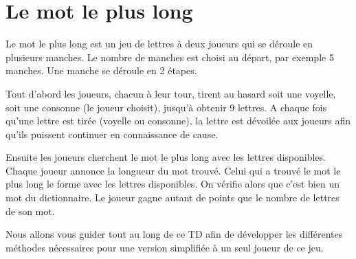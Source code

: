 \documentclass[a4paper,11pt]{style-esi/td}
\begin{document}


\section{Le mot le plus long}

	Le mot le plus long est un jeu de lettres à deux joueurs qui se déroule en
	plusieurs manches. Le nombre de manches est choisi au départ, par exemple 5 manches.
	Une manche se déroule en 2 étapes. 

	
	Tout d'abord les joueurs, chacun à leur tour, 
	tirent au hasard soit une voyelle, soit une consonne (le joueur choisit), 
	jusqu'à obtenir 9 lettres. A chaque fois qu'une lettre est tirée 
	(voyelle ou consonne), la lettre est dévoilée aux joueurs afin qu'ils puissent
	continuer en connaissance de cause.

	Ensuite les joueurs cherchent le mot le plus long avec les lettres disponibles.
	Chaque joueur annonce la longueur du mot trouvé. Celui qui a trouvé le mot le 
	plus long le forme avec les lettres disponibles. On vérifie alors que c'est 
	bien un mot du dictionnaire. Le joueur gagne autant de points que le nombre
	de lettres de son mot. 
			
	Nous allons vous guider tout au long de ce TD 
	afin de développer les différentes méthodes nécessaires 
	pour une version simplifiée à un seul joueur de ce jeu.
\end{document}
